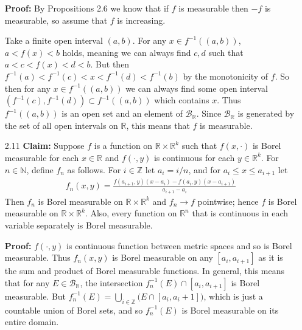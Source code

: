 \documentclass[11pt,letter]{article}
\begin{document}
\begin{enumerate}
    \textbf{Proof:} By Propositions 2.6 we know that if $f$ is measurable then $-f$ is measurable, so assume that $f$ is increasing. 
    
    Take a finite open interval $(a,b)$. For any $x \in f^{-1}((a,b))$, $a < f(x) < b$ holds, meaning we can always find $c,d$ such that $a < c < f(x) < d < b$. But then $f^{-1}(a) < f^{-1}(c) < x < f^{-1}(d) < f^{-1}(b)$ by the monotonicity of $f$. So then for any $x \in f^{-1}((a,b))$ we can always find some open interval $(f^{-1}(c), f^{-1}(d)) \subset f^{-1}((a,b))$ which contains $x$. Thus $f^{-1}((a,b))$ is an open set and an element of $\mathcal{B}_{\mathbb{R}}$. Since $\mathcal{B}_{\mathbb{R}}$ is generated by the set of all open intervals on $\mathbb{R}$, this means that $f$ is measurable.

    \item [2.11] \textbf{Claim:} Suppose $f$ is a function on $\mathbb{R} \times \mathbb{R}^k$ such that $f(x,\cdot)$ is Borel measurable for each $x \in \mathbb{R}$ and $f(\cdot,y)$ is continuous for each $y \in \mathbb{R}^k$. For $n \in \mathbb{N}$, define $f_n$ as follows. For $i \in \mathbb{Z}$ let $a_i = i/n$, and for $a_i \le x \le a_{i+1}$ let
    \begin{align*}
        f_n(x,y) = \frac{f(a_{i+1},y)(x-a_i) - f(a_i,y)(x - a_{i+1})}{a_{i+1} - a_i}
    \end{align*}
    Then $f_n$ is Borel measurable on $\mathbb{R} \times \mathbb{R}^k$ and $f_n \rightarrow f$ pointwise; hence $f$ is Borel measurable on $\mathbb{R} \times \mathbb{R}^k$. Also, every function on $\mathbb{R}^n$ that is continuous in each variable separately is Borel measurable.

    \textbf{Proof:} $f(\cdot, y)$ is continuous function between metric spaces and so is Borel measurable. Thus $f_n(x,y)$ is Borel measurable on any $[a_i,a_{i+1}]$ as it is the sum and product of Borel measurable functions. In general, this means that for any $E \in \mathcal{B}_{\mathbb{R}}$, the intersection $f_n^{-1}(E) \cap [a_i,a_{i+1}]$ is Borel measurable. But $f_n^{-1}(E) = \bigcup_{i \in \mathbb{Z}} \big(E \cap [a_i,a_i+1] \big)$, which is just a countable union of Borel sets, and so $f_n^{-1}(E)$ is Borel measurable on its entire domain.


\end{enumerate}
\end{document}
